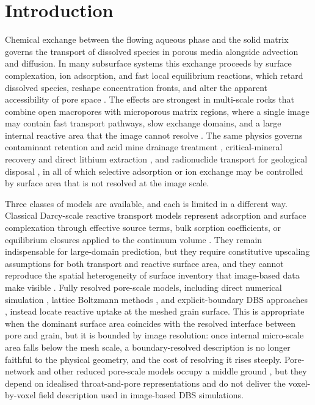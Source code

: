 \section{Introduction}

Chemical exchange between the flowing aqueous phase and the solid matrix
governs the transport of dissolved species in porous media alongside advection
and diffusion. In many subsurface systems this exchange proceeds by surface
complexation, ion adsorption, and fast local equilibrium reactions, which
retard dissolved species, reshape concentration fronts, and alter the apparent
accessibility of pore space \citep{dzombak1990surface}. The effects are
strongest in multi-scale rocks that combine open macropores with microporous
matrix regions, where a single image may contain fast transport pathways, slow
exchange domains, and a large internal reactive area that the image cannot
resolve \citep{menke2021upscaling}. The same physics governs contaminant
retention and acid mine drainage treatment
\citep{webster1998trace,blowes2000treatment}, critical-mineral recovery and
direct lithium extraction \citep{reich2022lithium,vera2023environmental}, and
radionuclide transport for geological disposal
\citep{miller2010upscaling,dewindt2019reactive,bildstein2019rtm}, in all of
which selective adsorption or ion exchange may be controlled by surface area
that is not resolved at the image scale.

Three classes of models are available, and each is limited in a different way.
Classical Darcy-scale reactive transport models represent adsorption and
surface complexation through effective source terms, bulk sorption
coefficients, or equilibrium closures applied to the continuum volume
\citep{steefel1990kinetic,steefel1994coupled,steefel2015reactive,mayer2002multicomponent,xu2006toughreact,lichtner1985continuum}.
They remain indispensable for large-domain prediction, but they require
constitutive upscaling assumptions for both transport and reactive surface
area, and they cannot reproduce the spatial heterogeneity of surface inventory
that image-based data make visible \citep{battiato2011applicability}. Fully
resolved pore-scale models, including direct numerical simulation
\citep{molins2021simulation,molins2015reactive,molins2012investigation,starchenko2018development},
lattice Boltzmann methods \citep{yoon2015lattice,kang2007lattice}, and
explicit-boundary DBS approaches
\citep{maes2018direct,maes2021geochemfoam,soulaine2017mineral}, instead locate
reactive uptake at the meshed grain surface. This is appropriate when the
dominant surface area coincides with the resolved interface between pore and
grain, but it is bounded by image resolution: once internal micro-scale area
falls below the mesh scale, a boundary-resolved description is no longer
faithful to the physical geometry, and the cost of resolving it rises steeply.
Pore-network and other reduced pore-scale models occupy a middle ground
\citep{blunt2001flow}, but they depend on idealised throat-and-pore
representations and do not deliver the voxel-by-voxel field description used in
image-based DBS simulations.

